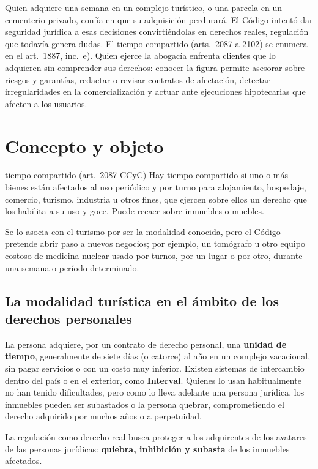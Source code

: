 \documentclass[12pt,oneside]{book}
\begin{document}
Quien adquiere una semana en un complejo turístico, o una parcela en un cementerio privado, confía en que su adquisición perdurará. El Código intentó dar seguridad jurídica a esas decisiones convirtiéndolas en derechos reales, regulación que todavía genera dudas. El tiempo compartido (arts.~2087 a 2102) se enumera en el art.~1887, inc.~e). Quien ejerce la abogacía enfrenta clientes que lo adquieren sin comprender sus derechos: conocer la figura permite asesorar sobre riesgos y garantías, redactar o revisar contratos de afectación, detectar irregularidades en la comercialización y actuar ante ejecuciones hipotecarias que afecten a los usuarios.

\section{Concepto y objeto}

\begin{definicion}{tiempo compartido (art.~2087 CCyC)}
Hay tiempo compartido si uno o más bienes están afectados al uso periódico y por turno para alojamiento, hospedaje, comercio, turismo, industria u otros fines, que ejercen sobre ellos un derecho que los habilita a su uso y goce. Puede recaer sobre inmuebles o muebles.
\end{definicion}

Se lo asocia con el turismo por ser la modalidad conocida, pero el Código pretende abrir paso a nuevos negocios; por ejemplo, un tomógrafo u otro equipo costoso de medicina nuclear usado por turnos, por un lugar o por otro, durante una semana o período determinado.

\subsection{La modalidad turística en el ámbito de los derechos personales}

La persona adquiere, por un contrato de derecho personal, una \textbf{unidad de tiempo}, generalmente de siete días (o catorce) al año en un complejo vacacional, sin pagar servicios o con un costo muy inferior. Existen sistemas de intercambio dentro del país o en el exterior, como \textbf{Interval}. Quienes lo usan habitualmente no han tenido dificultades, pero como lo lleva adelante una persona jurídica, los inmuebles pueden ser subastados o la persona quebrar, comprometiendo el derecho adquirido por muchos años o a perpetuidad.

\begin{importante}
La regulación como derecho real busca proteger a los adquirentes de los avatares de las personas jurídicas: \textbf{quiebra, inhibición y subasta} de los inmuebles afectados.
\end{importante}
\end{document}
